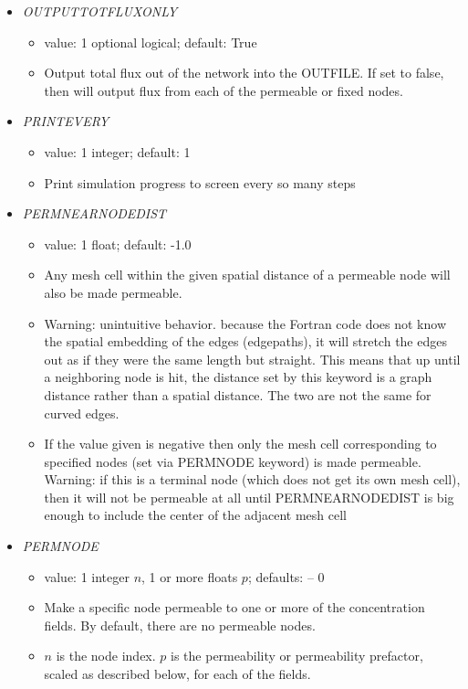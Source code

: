 \documentclass[12pt]{article}
\begin{document}
\begin{itemize}
\begin{itemize}
\end{itemize}
%
\item {\it OUTPUTTOTFLUXONLY}
\begin{itemize}
	\item  value: 1 optional logical; default: True
	\item Output total flux out of the network into the OUTFILE. If set to false, then will output flux from each of the permeable or fixed nodes.
\end{itemize}
%
\item {\it PRINTEVERY}
\begin{itemize}
	\item  value: 1 integer; default: 1
	\item Print simulation progress to screen every so many steps
\end{itemize}
%
\item {\it PERMNEARNODEDIST}
\begin{itemize}
	\item  value: 1 float; default: -1.0
	\item Any mesh cell within the given spatial distance of a permeable node will also be made permeable.
	\item {\color{red} Warning: unintuitive behavior.} because the Fortran code does not know the spatial embedding of the edges (edgepaths), it will stretch the edges out as if they were the same length but straight. This means that up until a neighboring node is hit, the distance set by this keyword is a graph distance rather than a spatial distance. The two are not the same for curved edges.
	\item If the value given is negative then only the mesh cell corresponding to specified nodes (set via PERMNODE keyword) is made permeable. {\color{red} Warning:} if this is a terminal node (which does not get its own mesh cell), then it will not be permeable at all until PERMNEARNODEDIST is big enough to include the center of the adjacent mesh cell
\end{itemize}
%
\item {\it PERMNODE}
\begin{itemize}
	\item  value: 1 integer $n$, 1 or more floats $p$; defaults: -- 0
	\item Make a specific node permeable to one or more of the concentration fields. By default, there are no permeable nodes.	
	\item $n$ is the node index. $p$ is the permeability or permeability prefactor, scaled as described below, for each of the fields.

\end{itemize}
\end{itemize}
\end{document}
